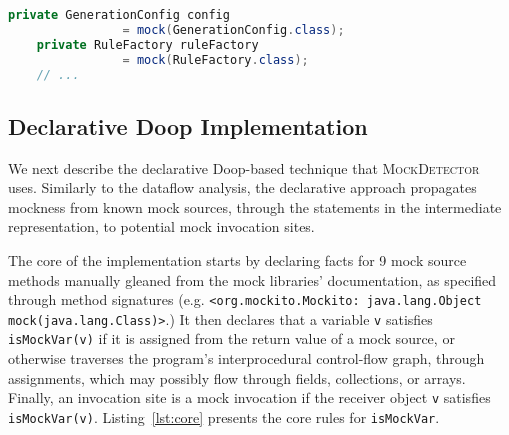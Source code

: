 \begin{lstlisting}[basicstyle=\ttfamily, caption={Example for field mocks defined by field initializations from \texttt{TypeRuleTest.java} in jsonschema2pojo.},
basicstyle=\scriptsize\ttfamily,language = Java, framesep=4.5mm,
framexleftmargin=1mm, captionpos=b, label=lis:fieldMock]
    private GenerationConfig config
                = mock(GenerationConfig.class);
    private RuleFactory ruleFactory
                = mock(RuleFactory.class);
    // ...
\end{lstlisting}

    

\subsection{Declarative Doop Implementation}
We next describe the declarative Doop-based technique that \textsc{MockDetector} uses. Similarly to the dataflow analysis, the declarative approach propagates mockness from known mock sources, through the statements in the intermediate representation, to potential mock invocation sites.

The core of the implementation starts by declaring facts for 9 mock source methods manually gleaned from the mock libraries' documentation, as specified through method signatures (e.g. 
\texttt{<org.mockito.Mockito: java.lang.Object mock(java.lang.Class)>}.)
It then declares that a variable {\tt v} satisfies \verb+isMockVar(v)+ if it is assigned from the return value of a mock source, or otherwise traverses the program's interprocedural control-flow graph, through assignments, which may possibly flow through fields, collections, or arrays. Finally, an invocation site is a mock invocation if the receiver object {\tt v} satisfies \verb+isMockVar(v)+. Listing~\ref{lst:core} presents the core rules for {\tt isMockVar}.

